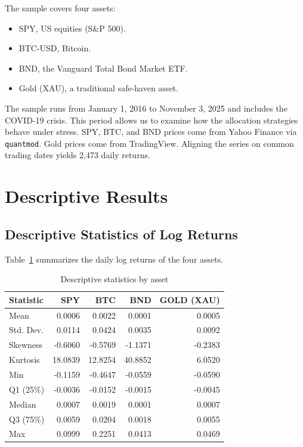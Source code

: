 \documentclass[12pt,a4paper]{article}
\begin{document}
The sample covers four assets:
\begin{itemize}
  \item SPY, US equities (S\&P 500).
  \item BTC-USD, Bitcoin.
  \item BND, the Vanguard Total Bond Market ETF.
  \item Gold (XAU), a traditional safe-haven asset.
\end{itemize}
The sample runs from January 1, 2016 to November 3, 2025 and includes the COVID-19 crisis. This period allows us to examine how the allocation strategies behave under stress.
SPY, BTC, and BND prices come from Yahoo Finance via \texttt{quantmod}. Gold prices come from TradingView. Aligning the series on common trading dates yields 2,473 daily returns.

\section{Descriptive Results}
\subsection{Descriptive Statistics of Log Returns}

Table~\ref{tab:desc} summarizes the daily log returns of the four assets.

\begin{table}[H]
\centering
\begin{tabular}{lrrrr}
\toprule
Statistic & SPY & BTC & BND & GOLD (XAU) \\
\midrule
Mean      & 0.0006  & 0.0022  & 0.0001  & 0.0005 \\
Std. Dev. & 0.0114  & 0.0424  & 0.0035  & 0.0092 \\
Skewness  & -0.6060 & -0.5769 & -1.1371 & -0.2383 \\
Kurtosis  & 18.0839 & 12.8254 & 40.8852 & 6.0520 \\
Min       & -0.1159 & -0.4647 & -0.0559 & -0.0590 \\
Q1 (25\%) & -0.0036 & -0.0152 & -0.0015 & -0.0045 \\
Median    & 0.0007  & 0.0019  & 0.0001  & 0.0007 \\
Q3 (75\%) & 0.0059  & 0.0204  & 0.0018  & 0.0055 \\
Max       & 0.0999  & 0.2251  & 0.0413  & 0.0469 \\
\bottomrule
\end{tabular}
\caption{Descriptive statistics by asset}
\label{tab:desc}
\end{table}
\end{document}
